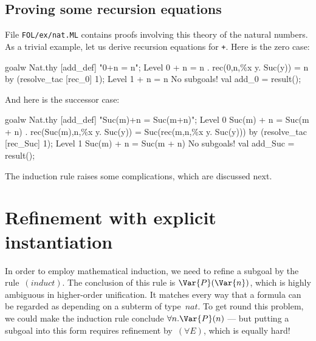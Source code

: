 \subsection{Proving some recursion equations}
File {\tt FOL/ex/nat.ML} contains proofs involving this theory of the
natural numbers.  As a trivial example, let us derive recursion equations
for \verb$+$.  Here is the zero case:
\begin{ttbox}
goalw Nat.thy [add_def] "0+n = n";
{\out Level 0}
{ + n = n}
{. rec(0,n,\%x y. Suc(y)) = n}
\ttbreak
by (resolve_tac [rec_0] 1);
{\out Level 1}
{ + n = n}
{\out No subgoals!}
val add_0 = result();
\end{ttbox}
And here is the successor case:
\begin{ttbox}
goalw Nat.thy [add_def] "Suc(m)+n = Suc(m+n)";
{\out Level 0}
{\out Suc(m) + n = Suc(m + n)}
{. rec(Suc(m),n,\%x y. Suc(y)) = Suc(rec(m,n,\%x y. Suc(y)))}
\ttbreak
by (resolve_tac [rec_Suc] 1);
{\out Level 1}
{\out Suc(m) + n = Suc(m + n)}
{\out No subgoals!}
val add_Suc = result();
\end{ttbox}
The induction rule raises some complications, which are discussed next.


\section{Refinement with explicit instantiation}
In order to employ mathematical induction, we need to refine a subgoal by
the rule~$(induct)$.  The conclusion of this rule is $\Var{P}(\Var{n})$,
which is highly ambiguous in higher-order unification.  It matches every
way that a formula can be regarded as depending on a subterm of type~$nat$.
To get round this problem, we could make the induction rule conclude
$\forall n.\Var{P}(n)$ --- but putting a subgoal into this form requires
refinement by~$(\forall E)$, which is equally hard!

